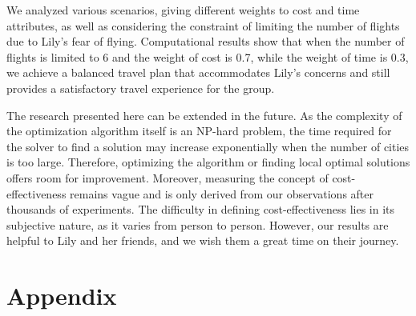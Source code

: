 \documentclass{article} %
\begin{document}
We analyzed various scenarios, giving different weights to cost and time attributes, as well as considering the constraint of limiting the number of flights due to Lily's fear of flying. Computational results show that when the number of flights is limited to 6 and the weight of cost is 0.7, while the weight of time is 0.3, we achieve a balanced travel plan that accommodates Lily's concerns and still provides a satisfactory travel experience for the group.

The research presented here can be extended in the future. As the complexity of the optimization algorithm itself is an NP-hard problem, the time required for the solver to find a solution may increase exponentially when the number of cities is too large. Therefore, optimizing the algorithm or finding local optimal solutions offers room for improvement. Moreover, measuring the concept of cost-effectiveness remains vague and is only derived from our observations after thousands of experiments. The difficulty in defining cost-effectiveness lies in its subjective nature, as it varies from person to person. However, our results are helpful to Lily and her friends, and we wish them a great time on their journey.




\clearpage
\appendix
\section{Appendix}%
\label{para:appendix}
\end{document}
